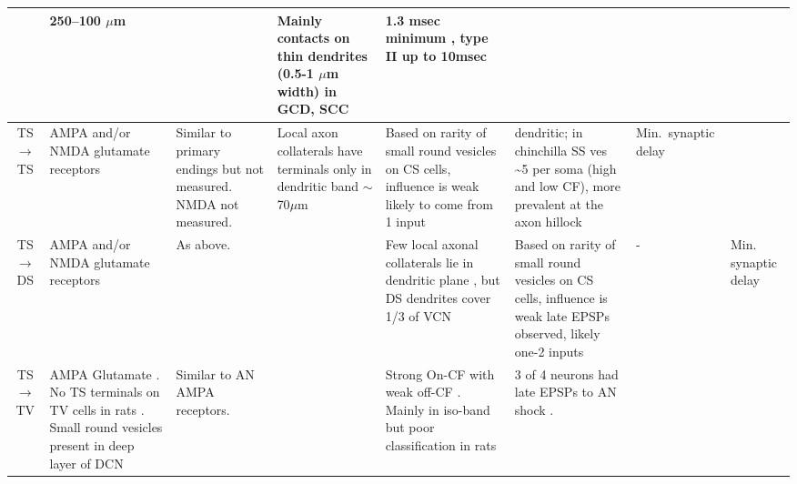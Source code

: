 \begin{longtable}{cXXXXXXX}
& %
250--100 $\mu$m \citep{FerragamoGoldingEtAl:1998a}                     
&                                            
& %
Mainly contacts on thin dendrites (0.5-1 $\mu$m width) in GCD, SCC 
\citep{BensonBrown:2004,FerragamoGoldingEtAl:1998}                
& %
1.3 msec minimum \citep{FerragamoGoldingEtAl:1998a}, 
type II up to 10msec \citep[theoretical][]{Brown:1993}
\\ \midrule
TS\ensuremath{\rightarrow}TS                        
& %
AMPA and/or NMDA glutamate receptors \citep{FerragamoGoldingEtAl:1998a}        
& %
Similar to primary endings but not measured.  
NMDA not measured.           
& %
Local axon collaterals have terminals only in dendritic band $\sim$70$\mu$m \citep[cat][]{SmithRhode:1989} 
& %
Based on rarity of small round vesicles on CS cells, influence is weak \citep{SmithRhode:1989} 
likely to come from 1 input \citep{FerragamoGoldingEtAl:1998a}                     
& %
dendritic; \citep{JosephsonMorest:1998}
in chinchilla SS ves \~{}5 per soma (high and low CF), more prevalent at the
                              axon hillock                                
& %
Min.\ synaptic delay 
\\ \midrule
TS\ensuremath{\rightarrow}DS                        
& %
AMPA and/or NMDA glutamate receptors \citep{FerragamoGoldingEtAl:1998a}  
& As above.                                   
& %
& %
Few local axonal collaterals lie in dendritic plane \citep{SmithRhode:1989}, but DS dendrites cover 1/3 of VCN
& 
Based on rarity of small round vesicles on CS cells, influence is weak \citep{SmithRhode:1989} late EPSPs observed,
likely one-2 inputs \citep{FerragamoGoldingEtAl:1998a, OertelWuEtAl:1990} 
& -                                     
& Min. synaptic delay \\ \midrule
TS\ensuremath{\rightarrow}TV                        
& %
AMPA Glutamate \citep{DoucetRossEtAl:1999,FerragamoGoldingEtAl:1998a,ZhangOertel:1993}.
No TS terminals on TV cells in rats \citep[rat][]{RubioJuiz:2004}.
Small round vesicles present in deep layer of DCN \citep[guinea pig][]{Alibardi:1999}
& 
Similar to AN AMPA receptors.        
& %
& %

Strong On-CF with weak off-CF  \citep[See fig 13][]{OstapoffBensonEtAl:1999}. 
Mainly in iso-band but poor classification in rats \citep{DoucetRossEtAl:1999,FriedlandPongstapornEtAl:2003}         
& %
3 of 4 neurons had late EPSPs to AN shock \citep[very young mice][]{ZhangOertel:1993}.
\citep{OstapoffBensonEtAl:1999} 


\end{longtable}
